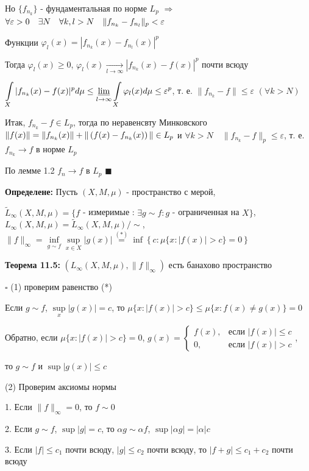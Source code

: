 \documentclass[a4paper]{report}
\newcommand*{\hm}[1]{#1\nobreak\discretionary{}%
            {\hbox{$\mathsurround=0pt #1$}}{}}
\begin{document}
Но $\{f_{n_k}\}$ - фундаментальная по норме $L_p$ $\Rightarrow$ $\forall\varepsilon>0\quad\exists N\quad\forall k,l>N\quad\|f_{n_k}\hm-f_{n_l}\|_p<\varepsilon$

Функции $\varphi_l(x)=|f_{n_k}(x)-f_{n_l}(x)|^p$

Тогда $\varphi_l(x)\ge0$, $\varphi_l(x)\xrightarrow[l\to\infty]{}|f_{n_k}(x)-f(x)|^p$ почти всюду

$\displaystyle\int\limits_X|f_{n_k}(x)-f(x)|^pd\mu\le\varliminf\limits_{l\to\infty}\displaystyle\int\limits_X\varphi_l(x)d\mu\le\varepsilon^p$, т. е. $\|f_{n_k}-f\|\le\varepsilon$ $(\forall k>N)$

Итак, $f_{n_k}-f\in L_p$, тогда по неравенсвту Минковского $\|f(x)\|=\|f_{n_k}(x)\|\hm+\|\left(f(x)-f_{n_k}(x)\right)\|\in L_p$ и $\forall k>N\quad\|f_{n_k}-f\|_p\le\varepsilon$, т. е. $f_{n_k}\to f$ в норме $L_p$

По лемме 1.2 $f_n\to f$ в $L_p$ $\blacksquare$
\bigskip

\noindent\textbf{Определене:} Пусть $(X,M,\mu)$ - пространство с мерой,

$\tilde L_\infty(X,M,\mu)=\{f$ - измеримые : $\exists g\sim f\colon g$ - ограниченная на $X\}$, $L_\infty(X,M,\mu)=\tilde L_\infty(X,M,\mu)/\sim$, $\|f\|_\infty=\inf\limits_{g\sim f}\sup\limits_{x\in X}|g(x)|\stackrel{(*)}{=}\inf\left\{c\colon\mu\{x\colon|f(x)|>c\}=0\right\}$
\bigskip

\noindent\textbf{Теорема 11.5:} $\left(L_\infty(X,M,\mu),\|f\|_\infty\right)$ есть банахово пространство

\noindent $\square$ (1) проверим равенство (*)

Если $g\sim f$, $\sup\limits_x|g(x)|=c$, то $\mu\{x\colon|f(x)|>c\}\le\mu\{x\colon f(x)\ne g(x)\}=0$

Обратно, если $\mu\{x\colon|f(x)|>c\}=0$, $g(x)=\begin{cases}f(x),&\text{если }|f(x)|\le c\\0,&\text{если }|f(x)|>c\end{cases}$,

то $g\sim f$ и $\sup|g(x)|\le c$

(2) Проверим аксиомы нормы

1. Если $\|f\|_\infty=0$, то $f\sim0$

2. Если $g\sim f$, $\sup|g|=c$, то $\alpha g\sim\alpha f$, $\sup|\alpha g|=|\alpha|c$

3. Если $|f|\le c_1$ почти всюду, $|g|\le c_2$ почти всюду, то $|f+g|\le c_1+c_2$ почти всюду
\end{document}
